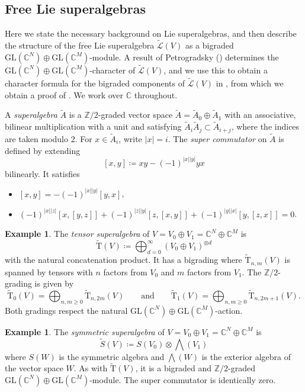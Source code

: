 \documentclass[11pt]{article}
\theoremstyle{definition}
\newtheorem{exam}[theo]{Example}
\numberwithin{equation}{section}
\newcommand\CC{\mathbb{C}}
\newcommand\ZZ{\mathbb{Z}}
\newcommand\GL{\mathrm{GL}}
\newcommand\Trm{\mathrm{T}}
\newcommand\Atil{\widetilde{A}}
\newcommand\Ltil{\widetilde{\mathcal{L}}}
\newcommand\Stil{\widetilde{S}}
\newcommand\Trmtil{\widetilde{\Trm}}
\begin{document}
\subsection{Free Lie superalgebras}\label{sec:lie-super}
Here we state the necessary background on Lie superalgebras, and then describe the structure of the free Lie superalgebra $\Ltil(V)$ as a bigraded $\GL(\CC^N) \oplus \GL(\CC^M)$-module. A result of Petrogradsky () determines the $\GL(\CC^N) \oplus \GL(\CC^M)$-character of $\Ltil(V)$, and we use this to obtain a character formula for the bigraded components of $\Ltil(V)$ in , from which we obtain a proof of . We work over $\CC$ throughout.

A \textit{superalgebra} $\Atil$ is a $\ZZ/2$-graded vector space $\Atil = \Atil_0 \oplus \Atil_1$ with an associative, bilinear multiplication with a unit and satisfying $\Atil_i \Atil_j \subset \Atil_{i+j}$, where the indices are taken modulo $2$. For $x \in \Atil_i$, write $|x| = i$. The \textit{super commutator} on $\Atil$ is defined by extending
  \[ [x, y] \coloneqq xy - (-1)^{|x||y|} yx \]
bilinearly. It satisfies 
\begin{itemize}
\item[S1.] $[x,y] = -(-1)^{|x||y|}[y,x]$,
\item[S2.] $(-1)^{|x||z|}[x,[y,z]] + (-1)^{|z||y|}[z,[x,y]] + (-1)^{|y||x|}[y,[z,x]] = 0$.
\end{itemize}

\begin{exam}
    The \textit{tensor superalgebra} of $V = V_0 \oplus V_1 = \CC^N \oplus \CC^M$ is
      \[ \Trmtil(V) \coloneqq \bigoplus_{d=0}^\infty (V_0 \oplus V_1)^{\otimes d} \]
    with the natural concatenation product. It has a bigrading where $\Trmtil_{n, m}(V)$ is spanned by tensors with $n$ factors from $V_0$ and $m$ factors from $V_1$. The $\ZZ/2$-grading is given by
      \[ \Trmtil_0(V) = \bigoplus_{n, m \geq 0} \Trmtil_{n, 2m}(V) \qquad\text{and}\qquad \Trmtil_1(V) = \bigoplus_{n, m \geq 0} \Trmtil_{n, 2m+1}(V). \]
    Both gradings respect the natural $\GL(\CC^N) \oplus \GL(\CC^M)$-action.
\end{exam}

\begin{exam}
    The \textit{symmetric superalgebra} of $V = V_0 \oplus V_1 = \CC^N \oplus \CC^M$ is
      \[ \Stil(V) \coloneqq S(V_0) \otimes \bigwedge(V_1) \]
    where $S(W)$ is the symmetric algebra and $\bigwedge(W)$ is the exterior algebra of the vector space $W$. As with $\Trmtil(V)$, it is a bigraded and $\ZZ/2$-graded $\GL(\CC^N) \oplus \GL(\CC^M)$-module. The super commutator is identically zero.
\end{exam}
\end{document}
